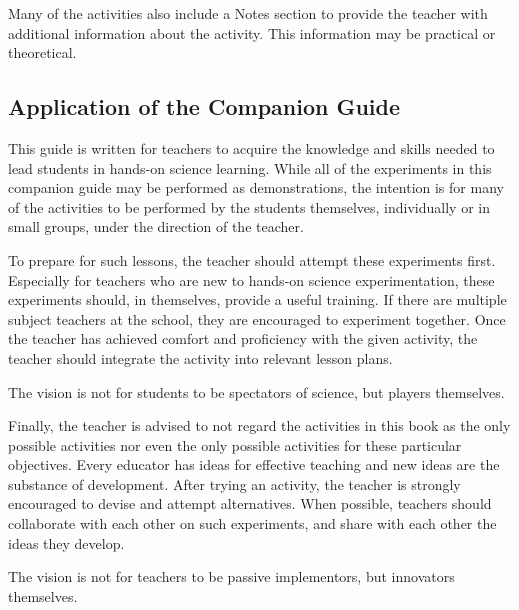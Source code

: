 Many of the activities also include a Notes section to provide the teacher with additional information about the activity. This information may be practical or theoretical.

\subsection*{Application of the Companion Guide}

This guide is written for teachers to acquire the knowledge and skills needed to lead students in hands-on science learning. While all of the experiments in this companion guide may be performed as demonstrations, the intention is for many of the activities to be performed by the students themselves, individually or in small groups, under the direction of the teacher.

To prepare for such lessons, the teacher should attempt these experiments first. Especially for teachers who are new to hands-on science experimentation, these experiments should, in themselves, provide a useful training. If there are multiple subject teachers at the school, they are encouraged to experiment together. Once the teacher has achieved comfort and proficiency with the given activity, the teacher should integrate the activity into relevant lesson plans.

The vision is not for students to be spectators of science, but players themselves.

Finally, the teacher is advised to not regard the activities in this book as the only possible activities nor even the only possible activities for these particular objectives. Every educator has ideas for effective teaching and new ideas are the substance of development. After trying an activity, the teacher is strongly encouraged to devise and attempt alternatives. When possible, teachers should collaborate with each other on such experiments, and share with each other the ideas they develop.

The vision is not for teachers to be passive implementors, but innovators themselves.

